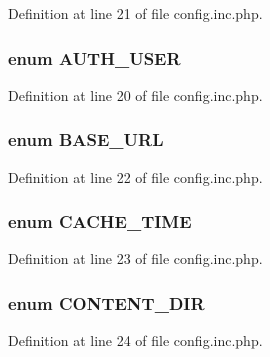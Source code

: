 Definition at line 21 of file config.inc.php.

\hypertarget{config_8inc_8php_a7d3a74ff015a9f789a5a2e554a9fa956}{
\subsubsection[{AUTH\_\-USER}]{\setlength{\rightskip}{0pt plus 5cm}enum {\bf AUTH\_\-USER}}}
\label{config_8inc_8php_a7d3a74ff015a9f789a5a2e554a9fa956}


Definition at line 20 of file config.inc.php.

\hypertarget{config_8inc_8php_a16548ab75ed30cbddce178d56d26dbb8}{
\subsubsection[{BASE\_\-URL}]{\setlength{\rightskip}{0pt plus 5cm}enum {\bf BASE\_\-URL}}}
\label{config_8inc_8php_a16548ab75ed30cbddce178d56d26dbb8}


Definition at line 22 of file config.inc.php.

\hypertarget{config_8inc_8php_afc454c0433a87811735836800fe3350b}{
\subsubsection[{CACHE\_\-TIME}]{\setlength{\rightskip}{0pt plus 5cm}enum {\bf CACHE\_\-TIME}}}
\label{config_8inc_8php_afc454c0433a87811735836800fe3350b}


Definition at line 23 of file config.inc.php.

\hypertarget{config_8inc_8php_a9949c9013641bf07cd112607d200d6ff}{
\subsubsection[{CONTENT\_\-DIR}]{\setlength{\rightskip}{0pt plus 5cm}enum {\bf CONTENT\_\-DIR}}}
\label{config_8inc_8php_a9949c9013641bf07cd112607d200d6ff}


Definition at line 24 of file config.inc.php.

